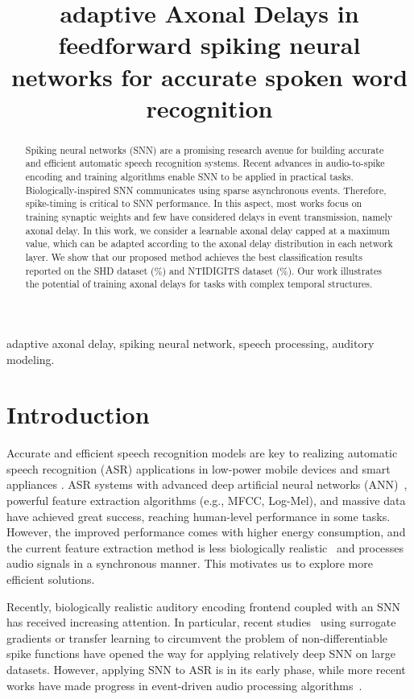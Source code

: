 \documentclass{article}
\title{
adaptive Axonal Delays 
in  feedforward spiking neural networks for accurate spoken word recognition}
\begin{document}
\maketitle
\begin{abstract}
Spiking neural networks (SNN) are a promising research avenue for building accurate and efficient automatic speech recognition systems. Recent advances in audio-to-spike encoding and training algorithms enable SNN to be applied in practical tasks. Biologically-inspired SNN communicates using sparse asynchronous events. Therefore, spike-timing is critical to SNN performance. In this aspect, most works focus on training synaptic weights and few have considered delays in event transmission, namely axonal delay. In this work, we consider a learnable axonal delay capped at a maximum value, which can be adapted according to the axonal delay distribution in each network layer. We show that our proposed method achieves the best classification results reported on the SHD dataset (\%) and NTIDIGITS dataset (\%). Our work illustrates the potential of training axonal delays for tasks with complex temporal structures.
\end{abstract}



\begin{keywords}
adaptive axonal delay, spiking neural network, speech processing, auditory modeling. 
\end{keywords}
\section{Introduction}
Accurate and efficient speech recognition models are key to realizing automatic speech recognition (ASR) applications in low-power mobile devices and smart appliances \cite{gopalakrishnan2020hfnet}. ASR systems with advanced deep artificial neural networks (ANN)~\cite{ graves2013speech}, powerful feature extraction algorithms (e.g., MFCC, Log-Mel), and massive data have achieved great success, reaching human-level performance in some tasks. However, the improved performance comes with higher energy consumption, and the current feature extraction method is less biologically realistic~\cite{baby2021convolutional} and processes audio signals in a synchronous manner. This motivates us to explore more efficient solutions. 

Recently, biologically realistic auditory encoding frontend \cite{Wu2018, pan2020efficient, wu2018spiking} coupled with an SNN has received increasing attention. In particular, recent studies~\cite{Neftci2019, Shrestha2018, zhang2021rectified} using surrogate gradients or transfer learning \cite{wu2021tandem,wu2021progressive,yang2022training} to circumvent the problem of non-differentiable spike functions have opened the way for applying relatively deep SNN on large datasets. However, applying SNN to ASR is in its early phase, while more recent works have made progress in event-driven audio processing algorithms~\cite{wu2019robust, wu2020deep, 10.1007/978-981-10-5230-9_57, Blouw2020,yilmaz2020deep, zhang2019mpd}.
\end{document}
